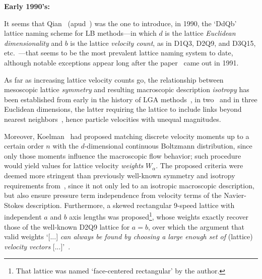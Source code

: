     \vspace{2.0mm}\noindent\textbf{Early 1990's:}\vspace{1.0mm}

    It seems that Qian~\cite{1990-QianYH-Paris} (apud~\cite[p.~235]{1993-QianYH-JSciComput}) was the one to introduce, in  1990,
    the `DdQb' lattice naming scheme for LB methods---in which $d$ is the lattice \emph{Euclidean dimensionality} and $b$ is the
    lattice  \emph{velocity   count},   as   in   D1Q3,   D2Q9,   and   D3Q15,   etc.~\cite{1992-QianYH+LallemandP-EuroPhysLett,
    1993-QianYH+OrszagSA-EuroPhysLett}---that seems to be the most prevalent lattice naming system  to  date,  although  notable
    exceptions appear long after the paper~\cite{1991-QianYH+LallemandP-AdvKinTheoContMech} came out in 1991.

    As far as increasing lattice velocity counts go, the relationship between mesoscopic lattice \emph{symmetry}  and  resulting
    macroscopic   description   \emph{isotropy}   has   been   established    from    early    in    the    history    of    LGA
    methods~\cite{1973-HardyJ+PazzisO-JMathPhys, 1976-HardyJ+PomeauY-PhysRevA},  in  two~\cite{1986-FrischU+PomeauY-PhysRevLett}
    and in three Euclidean dimensions, the latter requiring the lattice to include links beyond nearest neighbors~\cite[pp.~473,
    490]{1986-WolframS-JStatPhys}, hence particle velocities with unequal magnitudes.

    Moreover, Koelman~\cite{1991-KoelmanJMVA-EuroPhysLett} had proposed matching discrete velocity moments up to a certain order
    $n$ with the $d$-dimensional continuous Boltzmann distribution, since only those  moments  influence  the  macroscopic  flow
    behavior; such procedure would yield values for lattice velocity \emph{weights} $W_{\alpha}$.  The  proposed  criteria  were
    deemed more stringent than previously well-known symmetry  and  isotropy  requirements  from~\cite{1986-WolframS-JStatPhys},
    since it not only led to an isotropic macroscopic description, but also ensure  pressure  term  independence  from  velocity
    terms of the Navier-Stokes description. Furthermore, a skewed rectangular 9-speed lattice with independent $a$ and $b$  axis
    lengths was proposed\footnote{That lattice was named `face-centered rectangular' by  the  author.},  whose  weights  exactly
    recover those of the well-known D2Q9 lattice for $a = b$, over which the argument that valid weights `[...] \emph{can always
    be found by choosing a large enough set of} (lattice) \emph{velocity vectors\/} [...]'~\cite{1991-KoelmanJMVA-EuroPhysLett}.

